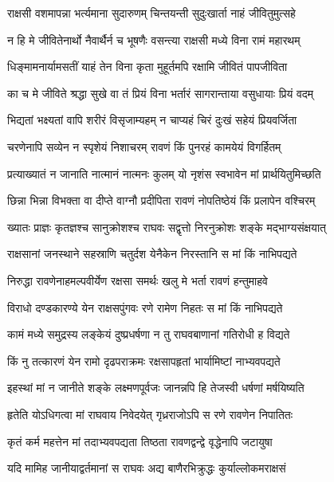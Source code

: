 \twolineshloka
{राक्षसी वशमापन्ना भर्त्यमाना सुदारुणम्}
{चिन्तयन्ती सुदुःखार्ता नाहं जीवितुमुत्सहे} %

\twolineshloka
{न हि मे जीवितेनार्थो नैवार्थैर्न च भूषणैः}
{वसन्त्या राक्षसी मध्ये विना रामं महारथम्} %

\twolineshloka
{धिङ्मामनार्यामसतीं याहं तेन विना कृता}
{मुहूर्तमपि रक्षामि जीवितं पापजीविता} %

\twolineshloka
{का च मे जीविते श्रद्धा सुखे वा तं प्रियं विना}
{भर्तारं सागरान्ताया वसुधायाः प्रियं वदम्} %

\twolineshloka
{भिद्यतां भक्ष्यतां वापि शरीरं विसृजाम्यहम्}
{न चाप्यहं चिरं दुःखं सहेयं प्रियवर्जिता} %

\twolineshloka
{चरणेनापि सव्येन न स्पृशेयं निशाचरम्}
{रावणं किं पुनरहं कामयेयं विगर्हितम्} %

\twolineshloka
{प्रत्याख्यातं न जानाति नात्मानं नात्मनः कुलम्}
{यो नृशंस स्वभावेन मां प्रार्थयितुमिच्छति} %

\twolineshloka
{छिन्ना भिन्ना विभक्ता वा दीप्ते वाग्नौ प्रदीपिता}
{रावणं नोपतिष्ठेयं किं प्रलापेन वश्चिरम्} %

\twolineshloka
{ख्यातः प्राज्ञः कृतज्ञश्च सानुक्रोशश्च राघवः}
{सद्वृत्तो निरनुक्रोशः शङ्के मद्भाग्यसंक्षयात्} %

\twolineshloka
{राक्षसानां जनस्थाने सहस्राणि चतुर्दश}
{येनैकेन निरस्तानि स मां किं नाभिपद्यते} %

\twolineshloka
{निरुद्धा रावणेनाहमल्पवीर्येण रक्षसा}
{समर्थः खलु मे भर्ता रावणं हन्तुमाहवे} %

\twolineshloka
{विराधो दण्डकारण्ये येन राक्षसपुंगवः}
{रणे रामेण निहतः स मां किं नाभिपद्यते} %

\twolineshloka
{कामं मध्ये समुद्रस्य लङ्केयं दुष्प्रधर्षणा}
{न तु राघवबाणानां गतिरोधी ह विद्यते} %

\twolineshloka
{किं नु तत्कारणं येन रामो दृढपराक्रमः}
{रक्षसापहृतां भार्यामिष्टां नाभ्यवपद्यते} %

\twolineshloka
{इहस्थां मां न जानीते शङ्के लक्ष्मणपूर्वजः}
{जानन्नपि हि तेजस्वी धर्षणां मर्षयिष्यति} %

\twolineshloka
{हृतेति योऽधिगत्वा मां राघवाय निवेदयेत्}
{गृध्रराजोऽपि स रणे रावणेन निपातितः} %

\twolineshloka
{कृतं कर्म महत्तेन मां तदाभ्यवपद्यता}
{तिष्ठता रावणद्वन्द्वे वृद्धेनापि जटायुषा} %

\twolineshloka
{यदि मामिह जानीयाद्वर्तमानां स राघवः}
{अद्य बाणैरभिक्रुद्धः कुर्याल्लोकमराक्षसं} %

